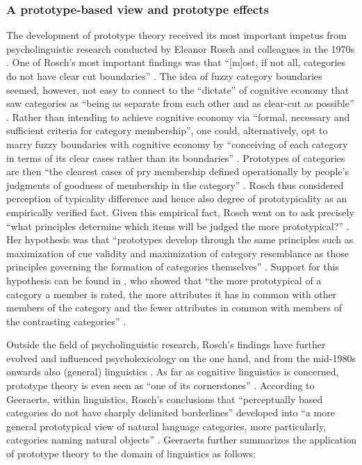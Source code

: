 \subsubsection{A prototype-based view and prototype effects}
\label{sec:2.4.3.1}  
The development of prototype theory received its most important impetus from psycholinguistic research conducted by Eleanor Rosch and colleagues in the 1970s \citep{rosch_cognitive_1975,rosch_family_1975,Rosch1978,margolis_principles_1999}. One of Rosch’s most important findings was that “[m]ost, if not all, categories do not have clear cut boundaries” \citep[196]{margolis_principles_1999}. The idea of fuzzy category boundaries seemed, however, not easy to connect to the ``dictate'' of cognitive economy that saw categories as “being as separate from each other and as clear-cut as possible” \citep[196]{margolis_principles_1999}. Rather than intending to achieve cognitive economy via “formal, necessary and sufficient criteria for category membership”, one could, alternatively, opt to marry fuzzy boundaries with cognitive economy by “conceiving of each category in terms of its clear cases rather than its boundaries” \citep[196]{margolis_principles_1999}. Prototypes of categories are then “the clearest cases of pry membership defined operationally by people’s judgments of goodness of membership in the category” \citep{margolis_principles_1999}. Rosch thus considered perception of typicality difference and hence also degree of prototypicality as an empirically verified fact. Given this empirical fact, Rosch went on to ask precisely “what principles determine which items will be judged the more prototypical?” \citep[197]{margolis_principles_1999}. Her hypothesis was that “prototypes develop through the same principles such as maximization of cue validity and maximization of category resemblance as those principles governing the formation of categories themselves” \citep{margolis_principles_1999}. Support for this hypothesis can be found in \citet{rosch_family_1975}, who showed that “the more prototypical of a category a member is rated, the more attributes it has in common with other members of the category and the fewer attributes in common with members of the contrasting categories” \citep[197]{margolis_principles_1999}.

Outside the field of psycholinguistic research, Rosch’s findings have further evolved and influenced psycholexicology on the one hand, and from the mid-1980s onwards also (general) linguistics \citep[578]{allan_lexical_2013}. As far as cognitive linguistics is concerned, prototype theory is even seen as “one of its cornerstones” \citep[145]{Geeraerts2006}. According to Geeraerts, within linguistics, Rosch’s conclusions that “perceptually based categories do not have sharply delimited borderlines” developed into “a more general prototypical view of natural language categories, more particularly, categories naming natural objects” \citep[578]{allan_lexical_2013}. Geeraerts further summarizes the application of prototype theory to the domain of linguistics as follows:

